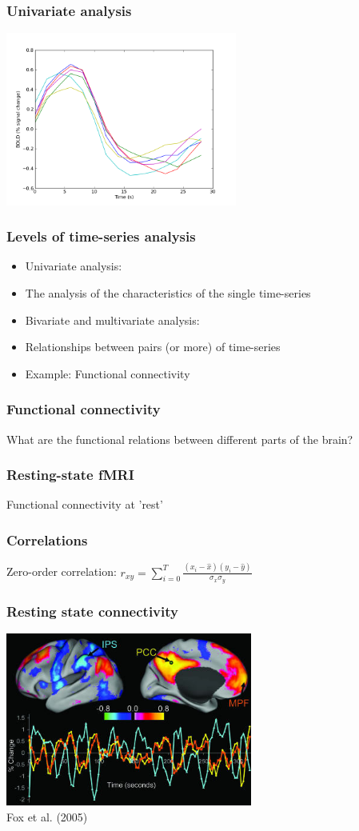 \documentclass{beamer}
\begin{document}
\begin{frame}
\frametitle{Univariate analysis}
\includegraphics[height=5.7cm]{figures/event_related_fmri_02}
\end{frame}

\begin{frame}
\frametitle{Levels of time-series analysis}
\begin{itemize}
\item
Univariate analysis: 
\item 
The analysis of the characteristics of the single time-series
\pause
\item
Bivariate and multivariate analysis:
\pause
\item
Relationships between pairs (or more) of time-series
\pause
\item
Example: Functional connectivity
\end{itemize}
\end{frame}

\begin{frame}
\frametitle{Functional connectivity}
What are the functional relations between different parts of the brain?
\end{frame}

\begin{frame}
\frametitle{Resting-state fMRI}
Functional connectivity at 'rest'
\end{frame}

\begin{frame}
\frametitle{Correlations}
\pause
Zero-order correlation:
\pause
$r_{xy} = \sum_{i=0}^{T}{\frac{(x_i-\hat{x})(y_i-\hat{y})}{\sigma_x \sigma_y}}$
\end{frame}

\begin{frame}
\frametitle{Resting state connectivity}
\includegraphics[height=5.7cm]{figures/fox_et_al}
\\
\hfill
Fox et al. (2005)
\end{frame}
\end{document}
